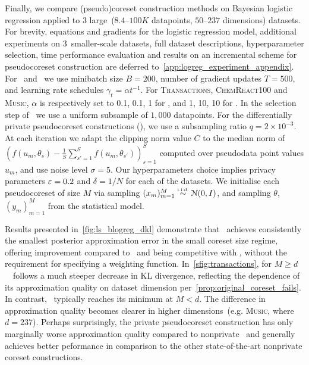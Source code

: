 Finally, we compare (pseudo)coreset construction methods on Bayesian logistic
regression applied to 3 large~($8.4$--$100K$ datapoints, $50$--$237$
dimensions) datasets. For brevity, equations and gradients for the logistic
regression model, additional experiments on \mbox{3 smaller-scale} datasets,
full dataset descriptions, hyperparameter selection, time performance
evaluation and results on an incremental scheme for pseudocoreset construction
are deferred to~\cref{app:logreg_experiment_appendix}. 
%
%
 For \psvi~and \sparsevi~we use minibatch size ${B=200}$, number of gradient
updates ${T=500}$, and learning rate schedules $ \gamma_t = \alpha t^{-1}$. For
\textsc{Transactions}, \textsc{ChemReact100} and \textsc{Music}, $\alpha$ is
respectively set to 0.1, 0.1, 1 for \sparsevi, and 1, 10, 10 for \psvi. In the
selection step of \sparsevi~we use a uniform subsample of $1,000$ datapoints.
For the differentially private pseudocoreset constructions (\dpsvi), we  use a
subsampling ratio $q=2\times10^{-3}$. At each iteration we adapt the clipping
norm value $ C $ to the median norm of $( f(u_m, \theta_s) - \frac{1}{S}
\sum_{s'=1}^{S} f(u_m, \theta_{s'}))_{s=1}^{S}$ computed
over pseudodata point values $u_m$, and use noise level $\sigma=5$. Our hyperparameters choice implies privacy parameters $\varepsilon=0.2$ and $\delta=1/N$ for each of the datasets. We
initialise each pseudocoreset of size $ M$ via sampling $(x_m)_{m=1}^{M} \distiid
\distNorm{(0, I)}$, and sampling $\theta$, $ (y_m)_{m=1}^{M} $ from the statistical
model.



Results presented in~\cref{fig:ls_blogreg_dkl} demonstrate that \psvi~achieves consistently the smallest posterior approximation error in the small coreset size regime, offering improvement
compared to \sparsevi~and being competitive with \gigao,
without the requirement for specifying a weighting function. In~\cref{sfig:transactions}, for $M \geq d$ ~\gigao~follows a much steeper decrease in KL divergence, reflecting the dependence of its approximation quality on dataset dimension per~\cref{prop:original_coreset_fails}. In contrast, \psvi~typically reaches its minimum at $M<d$. The difference in approximation quality becomes clearer in higher dimensions~(e.g. \textsc{Music}, where $d=237$). Perhaps surprisingly, the private pseudocoreset construction has only marginally worse approximation quality compared to nonprivate \psvi~and generally achieves better peformance in comparison to the other state-of-the-art nonprivate coreset constructions. 

